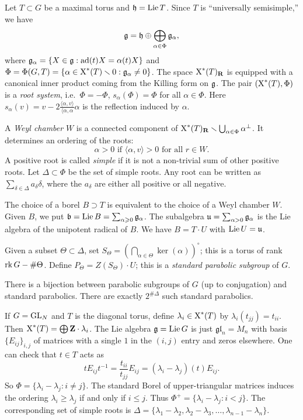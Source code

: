 Let $T\subset G$ be a maximal torus and $\mathfrak{h}=\operatorname{Lie} T$. Since $T$ is 
``universally semisimple,'' we have 
\[
  \mathfrak{g} = \mathfrak{h}\oplus \bigoplus_{\alpha\in \Phi} \mathfrak{g}_\alpha,
\]
where $\mathfrak{g}_\alpha=\{X\in \mathfrak{g}:\operatorname{ad}(t) X = \alpha(t) X\}$ and 
$\Phi=\Phi(G,T)=\{\alpha\in \operatorname{X}^\ast(T)\smallsetminus 0:\mathfrak{g}_\alpha\ne 0\}$. 
The space $\operatorname{X}^\ast(T)_{\mathbf{R}}$ is equipped with a canonical inner product 
coming from the Killing form on $\mathfrak{g}$. The pair 
$(\operatorname{X}^\ast(T),\Phi)$ is a \emph{root system}, i.e.~$\Phi=-\Phi$, 
$s_\alpha(\Phi)=\Phi$ for all $\alpha\in \Phi$. Here 
$s_\alpha(v) = v-2\frac{\langle \alpha,v\rangle}{\langle \alpha,\alpha} \alpha$ 
is the reflection induced by $\alpha$. 

A \emph{Weyl chamber} $W$ is a connected component of 
$\operatorname{X}^\ast(T)_{\mathbf{R}}\smallsetminus \bigcup_{\alpha\in \Phi} \alpha^\bot$. 
It determines an ordering of the roots: 
\[
  \alpha>0\text{ if }\langle \alpha,v\rangle>0\text{ for all }r\in W.
\]
A positive root is called \emph{simple} if it is not a non-trivial sum of 
other positive roots. Let $\Delta\subset \Phi$ be the set of simple roots. 
Any root can be written as $\sum_{\delta\in \Delta} a_\delta \delta$, where the 
$a_\delta$ are either all positive or all negative. 

The choice of a borel $B\supset T$ is equivalent to the choice of a Weyl chamber 
$W$. Given $B$, we put $\mathfrak{b}=\operatorname{Lie} B=\sum_{\alpha\geqslant 0} \mathfrak{g}_\alpha$. The 
subalgebra $\mathfrak{u}=\sum_{\alpha>0} \mathfrak{g}_\alpha$ is the Lie algebra of the unipotent 
radical of $B$. We have $B=T\cdot U$ with $\operatorname{Lie} U=\mathfrak{u}$. 

Given a subset $\Theta\subset \Delta$, set 
$S_\Theta=\left(\bigcap_{\alpha\in \Theta}\ker(\alpha)\right)^\circ$; this 
is a torus of rank $\operatorname{rk} G-\#\Theta$. Define 
$P_\Theta = Z(S_\Theta)\cdot U$; this is a \emph{standard parabolic subgroup} 
of $G$. 

\begin{theo}
There is a bijection between parabolic subgroups of $G$ (up to conjugation) 
and standard parabolics. There are exactly $2^{\# \Delta}$ such standard 
parabolics. 
\end{theo}

\begin{example}
If $G=\operatorname{GL}_N$ and $T$ is the diagonal torus, define  
$\lambda_i\in \operatorname{X}^\ast(T)$ by $\lambda_i(t_{j j}) = t_{i i}$. Then 
$\operatorname{X}^\ast(T)=\bigoplus \mathbf{Z}\cdot \lambda_i$. The Lie algebra 
$\mathfrak{g}=\operatorname{Lie} G$ is just $\mathfrak{gl}_n=M_n$ with basis 
$\{E_{i j}\}_{i,j}$ of matrices with a single $1$ in the $(i,j)$ entry 
and zeros elsewhere. One can check that $t\in T$ acts as 
\[
  t E_{i j} t^{-1} = \frac{t_{ii}}{t_{jj}} E_{i j} = (\lambda_i-\lambda_j)(t) E_{i j} .
\]
So $\Phi=\{\lambda_i-\lambda_j:i\ne j\}$. The standard Borel of upper-triangular 
matrices induces the ordering $\lambda_i\geqslant \lambda_j$ if and only if 
$i\leqslant j$. Thus $\Phi^+=\{\lambda_i-\lambda_j:i<j\}$. The corresponding set 
of simple roots is 
$\Delta=\{\lambda_1-\lambda_2,\lambda_2-\lambda_3,\dots,\lambda_{n-1}-\lambda_n\}$. 
\end{example}

